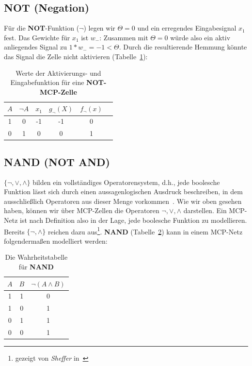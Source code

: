 {\subsection*{NOT (Negation)}

Für die \textbf{NOT}-Funktion ($\neg$) legen wir $\Theta = 0$ und ein erregendes Eingabesignal $x_1$ fest. Das Gewichte für $x_1$ ist $w_-$: Zusammen mit $\Theta = 0$ würde also ein aktiv anliegendes Signal zu $1 * w_-=-1 < \Theta$. Durch die resultierende Hemmung könnte das Signal die Zelle nicht aktivieren (Tabelle~\ref{tab:mcp-neg}):


\begin{table} %
    \centering
    \begin{tabular}{c | c | c |c | c | c}
        $A$ & $\neg A$ & $x_1$ & $g_{\neg}(X)$ & $f_{\neg}(x)$  \\
        \hline
         1   & 0        & -1     &  -1             & 0             \\
         0   & 1        & 0     &  0             &  1             \\
    \end{tabular}
    \caption{Werte der Aktivierungs- und Eingabefunktion für eine \textbf{NOT-MCP-Zelle}}
    \label{tab:mcp-neg}
\end{table}


\subsection*{NAND (NOT AND)}

$\{\neg, \lor, \land\}$ bilden ein vollständiges Operatorensystem, d.h., jede boolesche Funktion lässt sich durch einen aussagenlogischen Ausdruck  beschreiben, in dem ausschließlich Operatoren aus dieser Menge vorkommen~\cite[89]{Hof22}.
Wie wir oben gesehen haben, können wir über MCP-Zellen die Operatoren $\neg, \lor, \land$ darstellen.
Ein MCP-Netz ist nach Definition also in der Lage, jede boolesche Funktion zu modellieren.
Bereits $\{\neg, \land\}$ reichen dazu aus\footnote{gezeigt von \textit{Sheffer} in~\cite{She13}}. \textbf{NAND} (Tabelle~\ref{tab:nand}) kann in einem MCP-Netz folgendermaßen modelliert werden:

\begin{table} %
    \centering
    \begin{tabular}{c | c | c}
        $A$ & $B$ & $\neg(A \land B)$ \\
        \hline
        1   & 1   & 0           \\
        1   & 0   & 1           \\
        0   & 1   & 1           \\
        0   & 0   & 1           \\
    \end{tabular}
    \caption{Die Wahrheitstabelle für \textbf{NAND}}
    \label{tab:nand}
\end{table}


}
